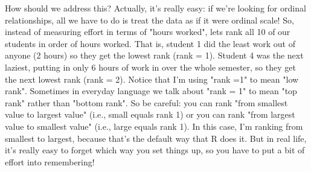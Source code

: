 How should we address this? Actually, it's really easy: if we're looking for ordinal relationships, all we have to do is treat the data as if it were ordinal scale! So, instead of measuring effort in terms of "hours worked", lets rank all 10 of our students in order of hours worked. That is, student 1 did the least work out of anyone (2 hours) so they get the lowest rank (rank = 1). Student 4 was the next laziest, putting in only  6 hours of work in over the whole semester, so they get the next lowest rank (rank = 2). Notice that I'm using "rank =1" to mean "low rank". Sometimes in everyday language we talk about "rank = 1" to mean "top rank" rather than "bottom rank". So be careful: you can rank "from smallest value to largest value" (i.e., small equals rank 1) or you can rank "from largest value to smallest value" (i.e., large equals rank 1). In this case, I'm ranking from smallest to largest, because that's the default way that R does it. But in real life, it's really easy to forget which way you set things up, so you have to put a bit of effort into remembering! 

